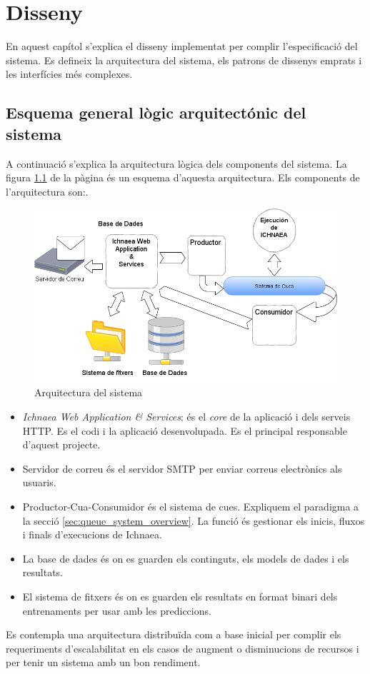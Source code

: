 \chapter{Disseny}
\label{cha:dessign}

En aquest cap\'{i}tol s'explica el disseny implementat per complir l'especificació del sistema. Es defineix la arquitectura del sistema, els patrons de dissenys emprats i les interfícies m\'{e}s complexes. 

\section{Esquema general l\`{o}gic arquitect\'{o}nic del sistema}
A continuació s'explica la arquitectura lògica dels components del sistema. La figura \ref{fig:archsoftware} de la p\`{a}gina \pageref{fig:archsoftware} \'{e}s un esquema d'aquesta arquitectura. Els components de l'arquitectura son:.\\

\begin{figure}[h!]
  \includegraphics[scale=0.5]{img/design/ArchitectureSoftware.png}
  \caption{Arquitectura del sistema}
  \label{fig:archsoftware}
\end{figure}

\begin{itemize}
\item \textit{Ichnaea Web Application \& Services}: \'{e}s el \textit{core} de la aplicaci\'{o} i dels serveis HTTP. Es el codi i la aplicació desenvolupada. Es el principal responsable d'aquest projecte.
\item Servidor de correu \'{e}s el servidor SMTP per enviar correus electr\`{o}nics als usuaris.
\item Productor-Cua-Consumidor \'{e}s el sistema de cues. Expliquem el paradigma a la secció \ref{sec:queue_system_overview}. La funci\'{o} \'{e}s gestionar els inicis, fluxos i finals d'execucions de Ichnaea.
\item La base de dades \'{e}s on es guarden els continguts, els models de dades i els resultats.
\item El sistema de fitxers \'{e}s on es guarden els resultats en format binari dels entrenaments per usar amb les prediccions.
\end{itemize}
Es contempla una arquitectura distribuïda com a base inicial per complir els requeriments d'escalabilitat en els casos de augment o disminucions de recursos i per tenir un sistema amb un bon rendiment.\\

